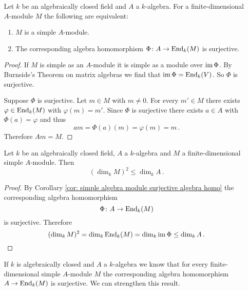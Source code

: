 \begin{cor}\label{cor: simple algebra module surjective algebra homo}
  Let $k$ be an algebraically closed field and $A$ a  $k$-algebra.
  For a finite-dimensional $A$-module $M$ the following are equivalent:
  \begin{enumerate}[label=\emph{\alph*)},leftmargin=*]
    \item
      $M$ is a simple $A$-module.
    \item
      The corresponding algebra homomorphism $\Phi \colon A \to \operatorname{End}_k(M)$ is surjective.
  \end{enumerate}
\end{cor}
\begin{proof}
  If $M$ is simple as an $A$-module it is simple as a module over $\operatorname{im} \Phi$.
  By Burnside’s Theorem on matrix algebras we find that $\operatorname{im} \Phi = \operatorname{End}_k(V)$.
  So $\Phi$ is surjective.
  
  Suppose $\Phi$ is surjective.
  Let $m \in M$ with $m \neq 0$.
  For every $m' \in M$ there exists $\varphi \in \operatorname{End}_k(M)$ with $\varphi(m) = m'$.
  Since $\Phi$ is surjective there exists $a \in A$ with $\Phi(a) = \varphi$ and thus
  \[
      am
    = \Phi(a)(m)
    = \varphi(m)
    = m \,.
  \]
  Therefore $Am = M$.
\end{proof}


\begin{cor}\label{cor: dimension simple algebra modules}
  Let $k$ be an algebraically closed field, $A$ a $k$-algebra and $M$ a finite-dimensional simple $A$-module.
  Then
  \[
          (\dim_k M)^2
    \leq  \dim_k A \,.
  \]
\end{cor}
\begin{proof}
  By Corollary \ref{cor: simple algebra module surjective algebra homo} the corresponding algebra homomorphism
  \[
            \Phi
    \colon  A
    \to     \operatorname{End}_k(M)
  \]
  is surjective. Therefore
  \[
          (\dim_k M)^2
    =     \dim_k \operatorname{End}_k(M)
    =     \dim_k \operatorname{im} \Phi
    \leq  \dim_k A \,.
    \qedhere
  \]
\end{proof}


If $k$ is algebraically closed and $A$ a $k$-algebra we know that for every finite-dimensional simple $A$-module $M$ the corresponding algebra homomorphism $A \to \operatorname{End}_k(M)$ is surjective.
We can strengthen this result.



